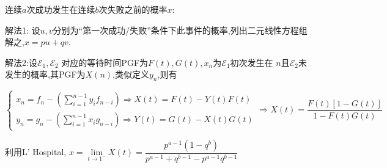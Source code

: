 连续$ a$次成功发生在连续$ b$次失败之前的概率$ x$:

解法1: 设$ u,v$分别为``第一次成功/失败''条件下此事件的概率,列出二元线性方程组解之,$ x=pu+qv$.

解法2:设$ \mathcal{E}_1,\mathcal{E}_2$ 对应的等待时间PGF为$ F(t), G(t),  x_n$为$ \mathcal{E}_1$初次发生在
$ n$且$ \mathcal{E}_2$未发生的概率,其PGF为$ X(n)$,类似定义$ y_n$,则有

$ \begin{cases}
 x_n =  f_n-(\sum_{i=1}^{n-1}y_if_{n-i}) \Rightarrow  X(t) = F(t)-Y(t)F(t) \\
 y_n =  g_n-(\sum_{i=1}^{n-1}x_ig_{n-i}) \Rightarrow  Y(t) = G(t)-X(t)G(t)
\end{cases}\Rightarrow X(t) = \dfrac{F(t)[1-G(t)]}{1-F(t)G(t)}$

利用L' Hospital, $x=\lim\limits_{t\to 1^{-}}X(t)=\dfrac{p^{a-1}(1-q^b)}{p^{a-1}+q^{b-1}-p^{a-1}q^{b-1}}$
\\
